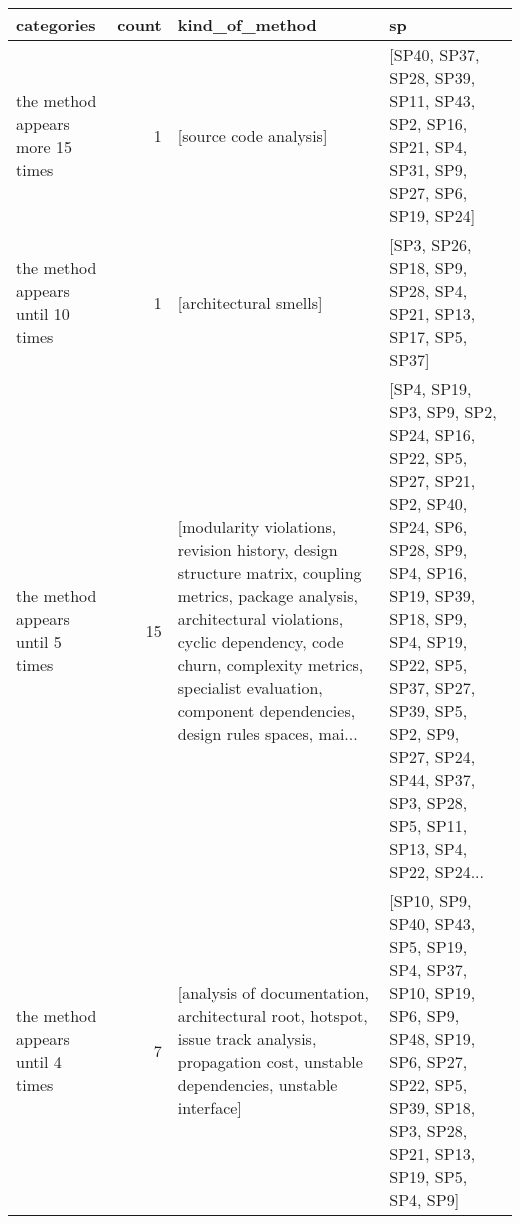 \begin{tabular}{lrll}
\toprule
                        categories &  count &                                                                                                                                                                                                                                                  kind\_of\_method &                                                                                                                                                                                                                                                              sp \\
\midrule
  the method appears more 15 times &      1 &                                                                                                                                                                                                                                          [source code analysis] &                                                                                                                                                                    [SP40, SP37, SP28, SP39, SP11, SP43, SP2, SP16, SP21, SP4, SP31, SP9, SP27, SP6, SP19, SP24] \\
 the method appears until 10 times &      1 &                                                                                                                                                                                                                                          [architectural smells] &                                                                                                                                                                                                  [SP3, SP26, SP18, SP9, SP28, SP4, SP21, SP13, SP17, SP5, SP37] \\
  the method appears until 5 times &     15 &  [modularity violations, revision history, design structure matrix, coupling metrics, package analysis, architectural violations, cyclic dependency, code churn, complexity metrics, specialist evaluation, component dependencies, design rules spaces, mai... &  [SP4, SP19, SP3, SP9, SP2, SP24, SP16, SP22, SP5, SP27, SP21, SP2, SP40, SP24, SP6, SP28, SP9, SP4, SP16, SP19, SP39, SP18, SP9, SP4, SP19, SP22, SP5, SP37, SP27, SP39, SP5, SP2, SP9, SP27, SP24, SP44, SP37, SP3, SP28, SP5, SP11, SP13, SP4, SP22, SP24... \\
  the method appears until 4 times &      7 &                                                                                                                     [analysis of documentation, architectural root, hotspot, issue track analysis, propagation cost, unstable dependencies, unstable interface] &                                                                                                   [SP10, SP9, SP40, SP43, SP5, SP19, SP4, SP37, SP10, SP19, SP6, SP9, SP48, SP19, SP6, SP27, SP22, SP5, SP39, SP18, SP3, SP28, SP21, SP13, SP19, SP5, SP4, SP9] \\

\end{tabular}
